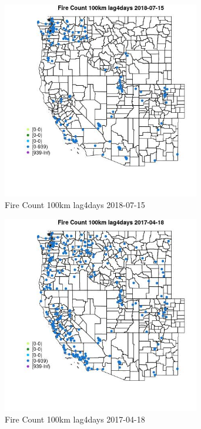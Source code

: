 \begin{figure} 
\centering  
\includegraphics[width=0.77\textwidth]{Code_Outputs/Report_ML_input_PM25_Step4_part_e_de_duplicated_aves_compiled_2019-05-20wNAs_MapObsFire_Count_100km_lag4days2018-07-15.jpg} 
\caption{\label{fig:Report_ML_input_PM25_Step4_part_e_de_duplicated_aves_compiled_2019-05-20wNAsMapObsFire_Count_100km_lag4days2018-07-15}Fire Count 100km lag4days 2018-07-15} 
\end{figure} 
 

\clearpage 

\begin{figure} 
\centering  
\includegraphics[width=0.77\textwidth]{Code_Outputs/Report_ML_input_PM25_Step4_part_e_de_duplicated_aves_compiled_2019-05-20wNAs_MapObsFire_Count_100km_lag4days2017-04-18.jpg} 
\caption{\label{fig:Report_ML_input_PM25_Step4_part_e_de_duplicated_aves_compiled_2019-05-20wNAsMapObsFire_Count_100km_lag4days2017-04-18}Fire Count 100km lag4days 2017-04-18} 
\end{figure} 
 

